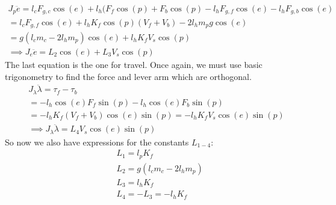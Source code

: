 \begin{gather*}
    J_p \ddot{e} = l_c F_{g,c} \cos(e) + l_h (F_f \cos(p) + F_b \cos(p) - l_h F_{g,f} \cos(e) - l_h F_{g,b} \cos(e) \\
    = l_c F_{g,f} \cos(e) + l_h K_f \cos(p) (V_f + V_b) - 2 l_h m_p g \cos(e) \\
    = g(l_c m_c - 2 l_h m_p) \cos(e) + l_h K_f V_s \cos(p) \\
    \implies J_e \ddot{e} = L_2 \cos(e) + L_3 V_s \cos(p)
\end{gather*}
The last equation is the one for travel. Once again, we must use basic trigonometry to find the force and lever arm which are orthogonal. 
\begin{gather*}
    J_\lambda \ddot{\lambda} = \tau_f - \tau_b \\
    = - l_h \cos(e) F_f \sin(p) - l_h \cos(e) F_b \sin(p)\\
    = - l_h K_f (V_f + V_b) \cos(e) \sin(p) = - l_h K_f V_s \cos(e) \sin(p)\\
    \implies J_\lambda \ddot{\lambda} = L_4 V_s \cos(e) \sin(p)
\end{gather*}
So now we also have expressions for the constants $L_{1-4}$:
\begin{subequations}\label{eq:constants-L}
    \begin{align}
        & L_1 = l_p K_f \label{eq:constant-L1}\\
        & L_2 = g (l_c m_c - 2 l_h m_p) \label{eq:constant-L2}\\
        & L_3 = l_h K_f \label{eq:constant-L3} \\
        & L_4 = - L_3 = - l_h K_f \label{eq:constant-L4}
    \end{align}
\end{subequations}

